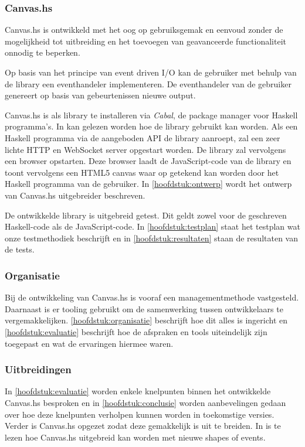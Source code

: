 \subsubsection{Canvas.hs}
Canvas.hs is ontwikkeld met het oog op gebruiksgemak en eenvoud zonder de mogelijkheid tot uitbreiding en het toevoegen van geavanceerde functionaliteit onnodig te beperken. 

Op basis van het principe van event driven I/O kan de gebruiker met behulp van de library een eventhandeler implementeren. De eventhandeler van de gebruiker genereert op basis van gebeurtenissen nieuwe output.

Canvas.hs is als library te installeren via \emph{Cabal}, de package manager voor Haskell programma's. In  kan gelezen worden hoe de library gebruikt kan worden. Als een Haskell programma via de aangeboden API de library aanroept, zal een zeer lichte HTTP en WebSocket server opgestart worden. De library zal vervolgens een browser opstarten. Deze browser laadt de JavaScript-code van de library en toont vervolgens een HTML5 canvas waar op getekend kan worden door het Haskell programma van de gebruiker. In \autoref{hoofdstuk:ontwerp} wordt het ontwerp van Canvas.hs uitgebreider beschreven.

De ontwikkelde library is uitgebreid getest. Dit geldt zowel voor de geschreven Haskell-code als de JavaScript-code. In \autoref{hoofdstuk:testplan} staat het testplan wat onze testmethodiek beschrijft en in \autoref{hoofdstuk:resultaten} staan de resultaten van de tests.

\subsubsection{Organisatie}
Bij de ontwikkeling van Canvas.hs is vooraf een managementmethode vastgesteld. Daarnaast is er tooling gebruikt om de samenwerking tussen ontwikkelaars te vergemakkelijken. \autoref{hoofdstuk:organisatie} beschrijft hoe dit alles is ingericht en \autoref{hoofdstuk:evaluatie} beschrijft hoe de afspraken en tools uiteindelijk zijn toegepast en wat de ervaringen hiermee waren.

\subsubsection{Uitbreidingen}
In \autoref{hoofdstuk:evaluatie} worden enkele knelpunten binnen het ontwikkelde Canvas.hs besproken en in \autoref{hoofdstuk:conclusie} worden aanbevelingen gedaan over hoe deze knelpunten verholpen kunnen worden in toekomstige versies. Verder is Canvas.hs opgezet zodat deze gemakkelijk is uit te breiden. In  is te lezen hoe Canvas.hs uitgebreid kan worden met nieuwe shapes of events.


